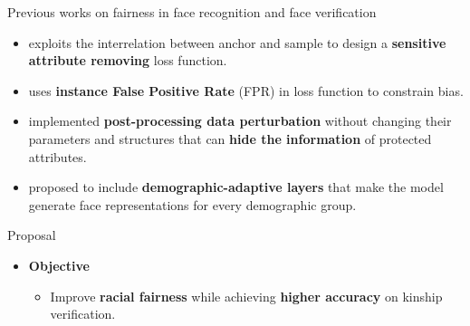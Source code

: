 \documentclass[aspectratio=169,xcolor=dvipsnames]{beamer}
\begin{document}

\begin{frame}{Previous works on fairness in face recognition and face verification}
    \begin{itemize}
        \item \cite{R22} exploits the interrelation between anchor and sample to design a \textbf{sensitive attribute removing} loss function.
        \item \cite{R42} uses \textbf{instance False Positive Rate} (FPR) in loss function to constrain bias.
        \item \cite{R39} implemented \textbf{post-processing data perturbation} without changing their parameters and structures that can \textbf{hide the information} of protected attributes.\
        \item \cite{R11} proposed to include \textbf{demographic-adaptive layers} that make the model generate face representations for every demographic group.
    \end{itemize}
\end{frame}


\begin{frame}{Proposal}
    \begin{itemize}
        \item \textbf{Objective}
        \begin{itemize}
            \item Improve \textbf{racial fairness} while achieving \textbf{higher accuracy} on kinship verification.
        \end{itemize}
    \end{itemize}
\end{frame}

\end{document}
